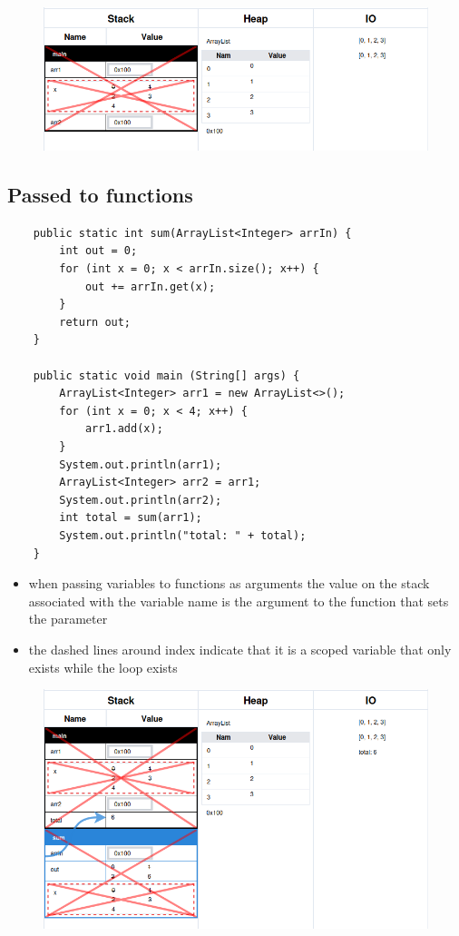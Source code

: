 \documentclass{article}
\begin{document}
\begin{figure}[H]
	\centering
	\includegraphics{arrayLists.png}
\end{figure}

\pagebreak

\subsection{Passed to functions}

\begin{verbatim}
	public static int sum(ArrayList<Integer> arrIn) {
	    int out = 0;
	    for (int x = 0; x < arrIn.size(); x++) {
	        out += arrIn.get(x);
	    }
	    return out;
	}

	public static void main (String[] args) {
	    ArrayList<Integer> arr1 = new ArrayList<>();
	    for (int x = 0; x < 4; x++) {
	        arr1.add(x);
	    }
	    System.out.println(arr1);
	    ArrayList<Integer> arr2 = arr1;
	    System.out.println(arr2);
	    int total = sum(arr1);
	    System.out.println("total: " + total);
	}
\end{verbatim}

\begin{itemize}
	\item when passing variables to functions as arguments the value on the
	stack associated with the variable name is the argument to the function
	that sets the parameter
	\item the dashed lines around index indicate that it is a scoped variable
	that only exists while the loop exists
\end{itemize}

\begin{figure}[H]
	\centering
	\includegraphics{arrayListsFunc.png}
\end{figure}
\end{document}
